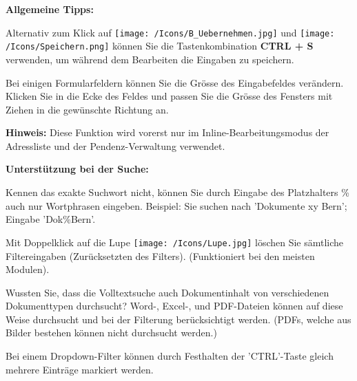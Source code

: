 \vspace{\baselineskip}

\textbf{Allgemeine Tipps:}
\begin{compactitem}
	\item Alternativ zum Klick auf \texttt{[image: /Icons/B\_Uebernehmen.jpg]} und \texttt{[image: /Icons/Speichern.png]} können Sie die Tastenkombination \textbf{CTRL + S} verwenden, um während dem Bearbeiten die Eingaben zu speichern.
	\item Bei einigen Formularfeldern können Sie die Grösse des Eingabefeldes verändern. Klicken Sie in die Ecke des Feldes  und passen Sie die Grösse des Fensters mit Ziehen in die gewünschte Richtung an.
\begin{figure}[H]
\end{figure}
\textbf{Hinweis:} Diese Funktion wird vorerst nur im Inline-Bearbeitungsmodus der Adressliste und der Pendenz-Verwaltung verwendet.
\end{compactitem}	

\vspace{\baselineskip}

\textbf{Unterstützung bei der Suche:}
\begin{compactitem}
	\item Kennen das exakte Suchwort nicht, können Sie durch Eingabe des Platzhalters \% auch nur Wortphrasen eingeben. Beispiel: Sie suchen nach 'Dokumente xy Bern'; Eingabe 'Dok\%Bern'.
	\item Mit Doppelklick auf die Lupe \texttt{[image: /Icons/Lupe.jpg]} löschen Sie sämtliche Filtereingaben (Zurücksetzten des Filters). (Funktioniert bei den meisten Modulen).
	\item Wussten Sie, dass die Volltextsuche auch Dokumentinhalt von verschiedenen Dokumenttypen durchsucht? Word-, Excel-, und PDF-Dateien können auf diese Weise durchsucht und bei der Filterung berücksichtigt werden. (PDFs, welche aus Bilder bestehen können nicht durchsucht werden.)
	\item Bei einem Dropdown-Filter können durch Festhalten der 'CTRL'-Taste gleich mehrere Einträge markiert werden.
\end{compactitem}	
	
